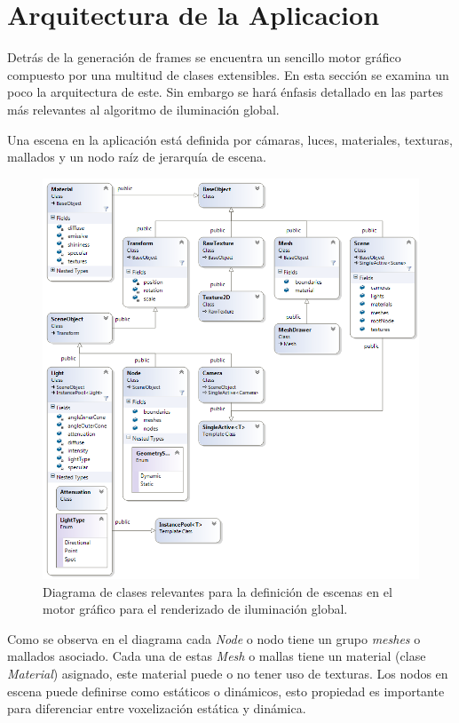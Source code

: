 \section{Arquitectura de la Aplicacion} %
\label{sec:arquitectura_de_la_aplicacion}
Detrás de la generación de frames se encuentra un sencillo motor gráfico compuesto por una multitud de clases extensibles. En esta sección se examina un poco la arquitectura de este. Sin embargo se hará énfasis detallado en las partes más relevantes al algoritmo de iluminación global.

Una escena en la aplicación está definida por cámaras, luces, materiales, texturas, mallados y un nodo raíz de jerarquía de escena.

\begin{figure}[H]
	\centering
	\captionsetup{justification=centering}
	\includegraphics[width=\linewidth]{media/ClassDiagram1.png}
	\caption{Diagrama de clases relevantes para la definición de escenas en el motor gráfico para el renderizado de iluminación global.}
\end{figure}

Como se observa en el diagrama cada \emph{Node} o nodo tiene un grupo \emph{meshes} o mallados asociado. Cada una de estas \emph{Mesh} o mallas tiene un material (clase \emph{Material}) asignado, este material puede o no tener uso de texturas. Los nodos en escena puede definirse como estáticos o dinámicos, esto propiedad es importante para diferenciar entre voxelización estática y dinámica.

